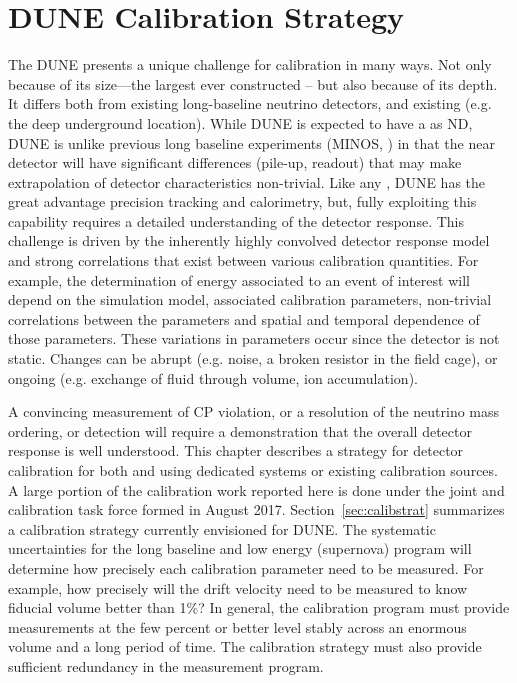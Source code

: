 \chapter{DUNE Calibration Strategy}
\label{ch:exec-summ-calib}

The DUNE  presents a unique challenge for calibration in many ways. Not only because of its size---the largest  ever constructed -- but also because of its depth. It differs both from existing long-baseline neutrino detectors, and existing  (e.g. the deep underground location). While DUNE is expected to have a  as ND, DUNE is unlike previous long baseline experiments (MINOS, ) in that the near detector will have significant differences (pile-up, readout) that may make extrapolation of detector characteristics non-trivial.  %
Like any , DUNE has the great advantage precision tracking and calorimetry, but,  fully exploiting this capability requires a detailed understanding of the detector response. This challenge is driven by the inherently highly convolved detector response model and strong correlations that exist between various calibration quantities. For example, the determination of energy associated to an event of interest will depend on the simulation model, associated calibration parameters, non-trivial correlations between the parameters and spatial and temporal dependence of those parameters. These variations in parameters occur since the detector is not static. Changes can be abrupt (e.g. noise, a broken resistor in the field cage), or ongoing (e.g. exchange of fluid through volume, ion accumulation). 

A convincing measurement of CP violation, or a resolution of the neutrino mass ordering, or   detection will require a demonstration that the overall detector response is well understood. %
This chapter describes a strategy for detector calibration for both 
 and  using dedicated  systems or existing calibration sources. A large portion of the calibration work reported here is done under the joint  and  calibration task force formed in August 2017.
Section~\ref{sec:calibstrat} summarizes a calibration strategy currently envisioned for DUNE. The systematic uncertainties for the long baseline and low energy (supernova) program will determine how precisely each calibration parameter need to be measured. For example, how precisely will the drift velocity need to be measured to know fiducial volume better than \num{1}\%? In general, the calibration program must provide measurements at the few percent or better level stably across an enormous volume and a long period of time. The calibration strategy must also provide sufficient redundancy in the measurement program.

